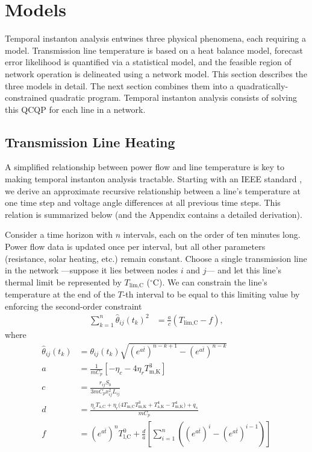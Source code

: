 \documentclass[journal,twoside]{IEEEtran}
\begin{document}
\section{Models}\label{sec:models}
Temporal instanton analysis entwines three physical phenomena, each requiring a model. Transmission line temperature is based on a heat balance model, forecast error likelihood is quantified via a statistical model, and the feasible region of network operation is delineated using a network model. This section describes the three models in detail. The next section combines them into a quadratically-constrained quadratic program. Temporal instanton analysis consists of solving this QCQP for each line in a network.


\subsection{Transmission Line Heating}\label{sec:models-heat}
A simplified relationship between power flow and line temperature is key to making temporal instanton analysis tractable. Starting with an IEEE standard \cite{ieee2013}, we derive an approximate recursive relationship between a line's temperature at one time step and voltage angle differences at all previous time steps. This relation is summarized below (and the Appendix contains a detailed derivation).

Consider a time horizon with $n$ intervals, each on the order of ten minutes long. Power flow data is updated once per interval, but all other parameters (resistance, solar heating, etc.) remain constant. Choose a single transmission line in the network ---suppose it lies between nodes $i$ and $j$--- and let this line's thermal limit be represented by $T_\text{lim,C}$ ($^\circ$C). We can constrain the line's temperature at the end of the $T$-th interval to be equal to this limiting value by enforcing the second-order constraint
\begin{align}\label{eq:tempconstraint}
\sum_{k=1}^n \hat{\theta}_{ij}(t_k)^2 &= \frac{a}{c}\left(T_\text{lim,C} - f\right),
\end{align}
where
\begin{subequations}\label{eq:heatbreakdown}
\begin{align}
\label{eq:heatbreakdown-theta}\hat{\theta}_{ij}(t_{k}) &= \theta_{ij}(t_k)\sqrt{ (e^{a\bar{t}})^{n-k+1} - (e^{a\bar{t}})^{n-k} } \\
\label{eq:heatbreakdown-a}a &= \frac{1}{mC_p}\left[ -\eta_c - 4\eta_r T_\text{m,K}^3 \right] \\
\label{eq:heatbreakdown-c}c &= \frac{r_{ij}S_b}{3 mC_p x_{ij}^2L_{ij}} \\
\label{eq:heatbreakdown-d}d &= \frac{ \eta_cT_\text{a,C} + \eta_r\big( 4T_\text{m,C}T_\text{m,K}^3 + T_\text{a,K}^4 - T_\text{m,K}^4   \big) + q_s }{mC_p} \\
\label{eq:heatbreakdown-f}f &= (e^{a\bar{t}})^n T_\text{l,C}^0 + \frac{d}{a}\left[ \sum_{i=1}^n \left( (e^{a\bar{t}})^i - (e^{a\bar{t}})^{i-1} \right)\right]
\end{align}
\end{subequations}
\end{document}
